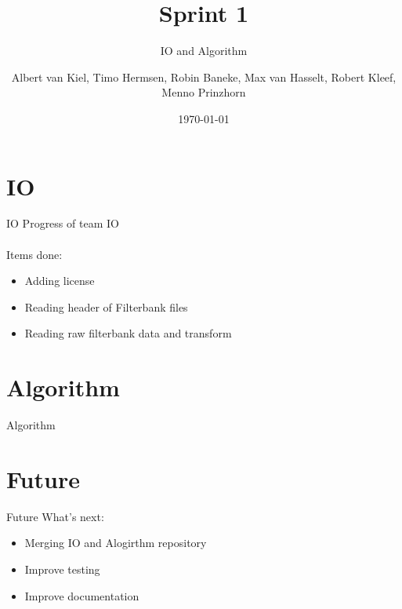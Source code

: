 \documentclass{beamer}
\title{Sprint 1}
\subtitle{IO and Algorithm}
\author{Albert van Kiel, Timo Hermsen, Robin Baneke, Max van Hasselt, Robert Kleef, Menno Prinzhorn}
\date{\today}
\begin{document}
\begin{frame}
    \titlepage
\end{frame}

\section{IO}
    
\begin{frame}{IO}
    Progress of team IO
    \\~\\
    Items done:
    \begin{itemize}
        \item Adding license
        \item Reading header of Filterbank files
        \item Reading raw filterbank data and transform
    \end{itemize}
\end{frame}


\section{Algorithm}
    
\begin{frame}{Algorithm}
\end{frame}


\section{Future}

\begin{frame}{Future}
    What's next:       
    \begin{itemize}
        \item Merging IO and Alogirthm repository
        \item Improve testing
        \item Improve documentation
    \end{itemize}
\end{frame}
\end{document}

